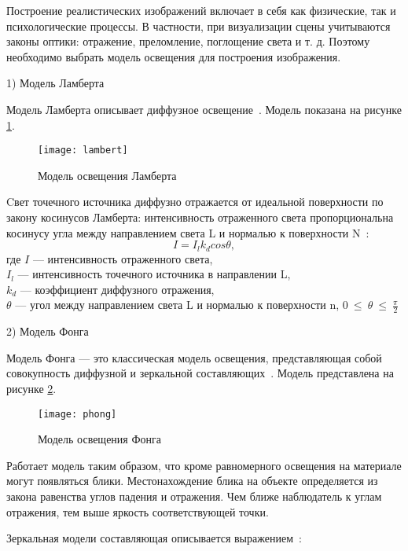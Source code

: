 Построение реалистических изображений включает в себя как физические,
так и психологические процессы. В частности, при визуализации сцены
учитываются законы оптики: отражение, преломление, поглощение света и т. д.
Поэтому необходимо выбрать модель освещения для построения изображения.

1) Модель Ламберта

Модель Ламберта описывает диффузное освещение~\cite{rojers}. Модель показана на рисунке \ref{lambert}.

\begin{figure}[H]
	\centering
	\texttt{[image: lambert]}
	\caption{Модель освещения Ламберта}
	\label{lambert}
\end{figure}

Cвет точечного источника диффузно отражается от идеальной поверхности по закону косинусов Ламберта: интенсивность отраженного света пропорциональна косинусу угла между направлением света L и нормалью к поверхности N~\cite{rojers}:
\begin{equation}\label{lambert_eq}
	I = I_l k_d cos \theta,
\end{equation}
где $I$ --- интенсивность отраженного света,\\
\text{~~~~~~}$I_l$ --- интенсивность точечного источника в направлении L,\\
\text{~~~~~~}$k_d$ --- коэффициент диффузного отражения,\\
\text{~~~~~~}$\theta$ --- угол между направлением света L и нормалью к поверхности n, $0~\le~\theta~\le~\frac{\pi}{2}$

2) Модель Фонга

Модель Фонга --- это классическая модель освещения, представляющая
собой совокупность диффузной и зеркальной составляющих~\cite{rojers}. Модель представлена на рисунке \ref{phong}.

\begin{figure}[H]
	\centering
	\texttt{[image: phong]}
	\caption{Модель освещения Фонга}
	\label{phong}
\end{figure}

Работает модель
таким образом, что кроме равномерного освещения на материале могут появляться
блики. Местонахождение блика на объекте определяется из закона равенства углов
падения и отражения. Чем ближе наблюдатель к углам отражения, тем выше
яркость соответствующей точки.

Зеркальная модели составляющая описывается выражением~\cite{rojers}:


